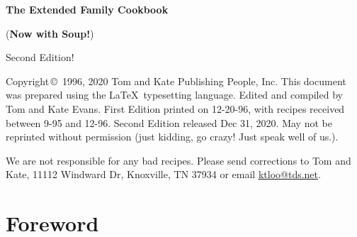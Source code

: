 \documentclass[12pt]{book}
\begin{document}

\frontmatter

\begin{titlepage}
\vspace*{1.5in}
\begin{center}
\begin{Huge}
\vspace{2\baselineskip}
{\bf The Extended Family Cookbook}\\
\end{Huge}
\begin{huge}
\vspace{\baselineskip}
({\bf Now with Soup!})\\
\end{huge}
\begin{LARGE}
\vspace{3\baselineskip}
Second Edition!
\end{LARGE}
\end{center}
\end{titlepage}

\vspace*{\fill}
Copyright\,\copyright\, 1996, 2020 Tom and Kate Publishing People, Inc.
This document was prepared using the \LaTeX\ typesetting language.
Edited and compiled by Tom and Kate Evans.
First Edition printed on 12-20-96, with recipes received between 9-95 and
12-96.
Second Edition released Dec 31, 2020.
May not be reprinted without permission (just kidding, go crazy! Just speak well of us.).

\vspace{1\baselineskip}
We are not responsible for any bad recipes. Please send corrections to Tom and Kate, 11112 Windward Dr, Knoxville, TN 37934 or email \href{mailto:ktloo@tds.net}{ktloo@tds.net}.
\pagebreak

\pagestyle{headings}
\tableofcontents

\chapter{Foreword}
\end{document}
